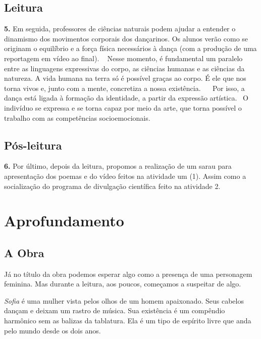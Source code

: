 \documentclass[12pt]{extarticle}
\begin{document}




\subsection{Leitura}

\textbf{5.} Em seguida, professores de ciências naturais podem ajudar a
entender o dinamismo dos movimentos corporais dos dançarinos. Os alunos verão
como se originam o equilíbrio e a força física necessários à dança (com a
produção de uma reportagem em vídeo ao final).    Nesse momento, é fundamental
um paralelo entre as linguagens expressivas do corpo, as ciências humanas e as
ciências da natureza. A vida humana na terra só é possível graças ao corpo. É
ele que nos torna vivos e, junto com a mente, concretiza a nossa existência.   
Por isso, a dança está ligada à formação da identidade, a partir da expressão
artística.  O indivíduo se expressa e se torna capaz por meio da arte, que
torna possível o trabalho com as competências socioemocionais.


\subsection{Pós-leitura}

\textbf{6.} Por último, depois da leitura, propomos a realização de um sarau
para apresentação dos poemas e do vídeo feitos na atividade um (1). Assim como
a socialização do programa de divulgação científica feito na atividade 2.

\section{Aprofundamento}


\subsection{A Obra}

Já no título da obra podemos esperar algo como a presença de uma personagem
feminina. Mas durante a leitura, aos poucos, começamos a suspeitar de algo.

\textit{Sofia} é uma mulher vista pelos olhos de um homem apaixonado. Seus cabelos
dançam e deixam um rastro de música. Sua existência é um compêndio harmônico
sem as balizas da tablatura. Ela é um tipo de espírito livre que anda pelo
mundo desde os dois anos.
\end{document}
